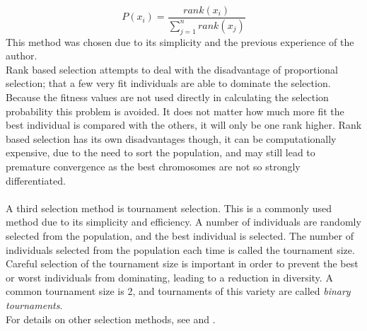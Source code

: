 \begin{equation}
\label{eq:rank}
  P(x_{i}) = \frac{rank(x_{i})}{\sum_{j=1}^{n}{rank(x_{j})}}
\end{equation} 
This method was chosen due to its simplicity and the previous experience of the author.
\\Rank based selection attempts to deal with the disadvantage of proportional selection; that a few very fit individuals are able to dominate the selection. Because the fitness values are not used directly in calculating the selection probability this problem is avoided. It does not matter how much more fit the best individual is compared with the others, it will only be one rank higher. Rank based selection has its own disadvantages though, it can be computationally expensive, due to the need to sort the population, and may still lead to premature convergence as the best chromosomes are not so strongly differentiated\cite{gatsp}.
\\\\A third selection method is tournament selection. This is a commonly used method due to its simplicity and efficiency. A number of individuals are randomly selected from the population, and the best individual is selected\cite{4-se, eoselect, gaselect, gatsp}. The number of individuals selected from the population each time is called the tournament size. Careful selection of the tournament size is important in order to prevent the best or worst individuals from dominating, leading to a reduction in diversity\cite{4-se, gatsp}. A common tournament size is 2, and tournaments of this variety are called \emph{binary tournaments}\cite{gaselect, gatsp}.
\\For details on other selection methods, see \cite{4-se} and \cite{gaselect}.

